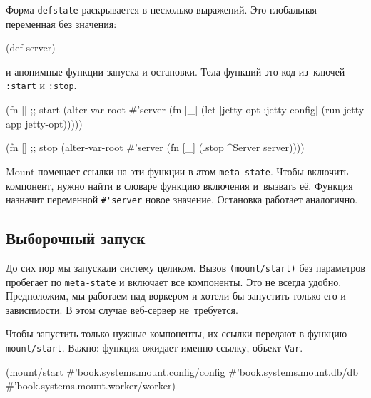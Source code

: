 Форма \verb|defstate| раскрывается в несколько выражений. Это глобальная
переменная без значения:


\begin{english}
  \begin{clojure}
(def server)
  \end{clojure}
\end{english}

\noindent
и анонимные функции запуска и остановки. Тела функций это код из~ключей
\verb|:start| и \verb|:stop|.

\begin{english}
  \begin{clojure}
(fn [] ;; start
  (alter-var-root #'server
   (fn [_]
     (let [{jetty-opt :jetty} config]
       (run-jetty app jetty-opt)))))

(fn [] ;; stop
  (alter-var-root #'server
   (fn [_]
     (.stop ^Server server))))
  \end{clojure}
\end{english}

Mount помещает ссылки на эти функции в атом \verb|meta-state|. Чтобы включить
компонент, нужно найти в словаре функцию включения и~вызвать её. Функция
назначит переменной \verb|#'server| новое значение. Остановка работает
аналогично.

\subsection{Выборочный запуск}


До сих пор мы запускали систему целиком. Вызов \verb|(mount/start)| без
параметров пробегает по \verb|meta-state| и включает все компоненты. Это не
всегда удобно. Предположим, мы работаем над воркером и хотели бы запустить
только его и зависимости. В этом случае веб-сервер не~требуется.

Чтобы запустить только нужные компоненты, их ссылки передают в функцию
\verb|mount/start|. Важно: функция ожидает именно ссылку, объект \verb|Var|.

\begin{english}
  \begin{clojure}
(mount/start
  #'book.systems.mount.config/config
  #'book.systems.mount.db/db
  #'book.systems.mount.worker/worker)
  \end{clojure}
\end{english}

